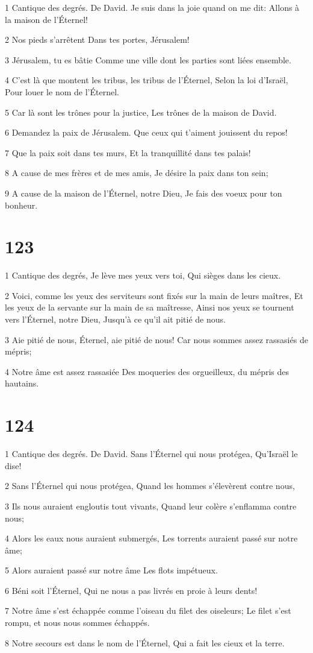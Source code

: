 \par 1 Cantique des degrés. De David. Je suis dans la joie quand on me dit: Allons à la maison de l'Éternel!
\par 2 Nos pieds s'arrêtent Dans tes portes, Jérusalem!
\par 3 Jérusalem, tu es bâtie Comme une ville dont les parties sont liées ensemble.
\par 4 C'est là que montent les tribus, les tribus de l'Éternel, Selon la loi d'Israël, Pour louer le nom de l'Éternel.
\par 5 Car là sont les trônes pour la justice, Les trônes de la maison de David.
\par 6 Demandez la paix de Jérusalem. Que ceux qui t'aiment jouissent du repos!
\par 7 Que la paix soit dans tes murs, Et la tranquillité dans tes palais!
\par 8 A cause de mes frères et de mes amis, Je désire la paix dans ton sein;
\par 9 A cause de la maison de l'Éternel, notre Dieu, Je fais des voeux pour ton bonheur.

\chapter{123}

\par 1 Cantique des degrés, Je lève mes yeux vers toi, Qui sièges dans les cieux.
\par 2 Voici, comme les yeux des serviteurs sont fixés sur la main de leurs maîtres, Et les yeux de la servante sur la main de sa maîtresse, Ainsi nos yeux se tournent vers l'Éternel, notre Dieu, Jusqu'à ce qu'il ait pitié de nous.
\par 3 Aie pitié de nous, Éternel, aie pitié de nous! Car nous sommes assez rassasiés de mépris;
\par 4 Notre âme est assez rassasiée Des moqueries des orgueilleux, du mépris des hautains.

\chapter{124}

\par 1 Cantique des degrés. De David. Sans l'Éternel qui nous protégea, Qu'Israël le dise!
\par 2 Sans l'Éternel qui nous protégea, Quand les hommes s'élevèrent contre nous,
\par 3 Ils nous auraient engloutis tout vivants, Quand leur colère s'enflamma contre nous;
\par 4 Alors les eaux nous auraient submergés, Les torrents auraient passé sur notre âme;
\par 5 Alors auraient passé sur notre âme Les flots impétueux.
\par 6 Béni soit l'Éternel, Qui ne nous a pas livrés en proie à leurs dents!
\par 7 Notre âme s'est échappée comme l'oiseau du filet des oiseleurs; Le filet s'est rompu, et nous nous sommes échappés.
\par 8 Notre secours est dans le nom de l'Éternel, Qui a fait les cieux et la terre.

